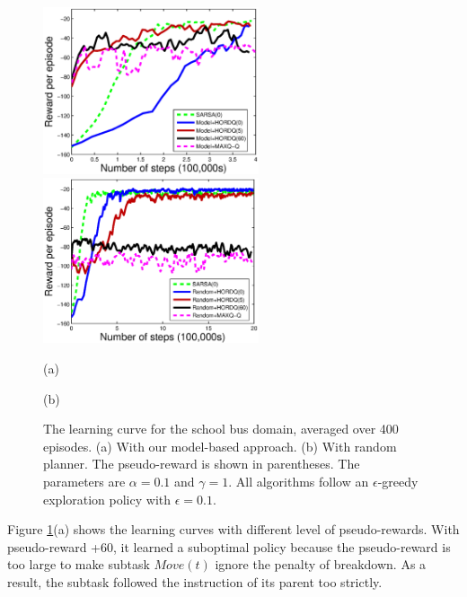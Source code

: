 \begin{figure}[t]
 \begin{minipage}[b]{0.5\linewidth}
     \begin{center}
    \includegraphics[width=2.5in] {./figures/Approx.eps}
\end{center}
\end{minipage}
\begin{minipage}[b]{0.5\linewidth}
     \begin{center}
    \includegraphics[width=2.5in] {./figures/Random.eps}
\end{center}
\end{minipage}
\begin{minipage}[b]{0.5\linewidth} \centering (a) \end{minipage}
\begin{minipage}[b]{0.5\linewidth} \centering (b) \end{minipage}

\caption{The learning curve for the school bus domain, averaged over 400 episodes. (a) With our model-based approach. (b) With random planner.
The pseudo-reward is shown in parentheses. The parameters are $\alpha=0.1$ and $\gamma=1$. All algorithms follow an $\epsilon$-greedy exploration policy
with $\epsilon = 0.1$.}
\label{fig:res}
\end{figure}

Figure \ref{fig:res}(a) shows the learning curves with different level of pseudo-rewards.
With pseudo-reward +60, it learned a suboptimal policy because
the pseudo-reward is too large to make subtask $Move(t)$ ignore 
the penalty of breakdown. As a result, the subtask followed 
the instruction of its parent too strictly.

